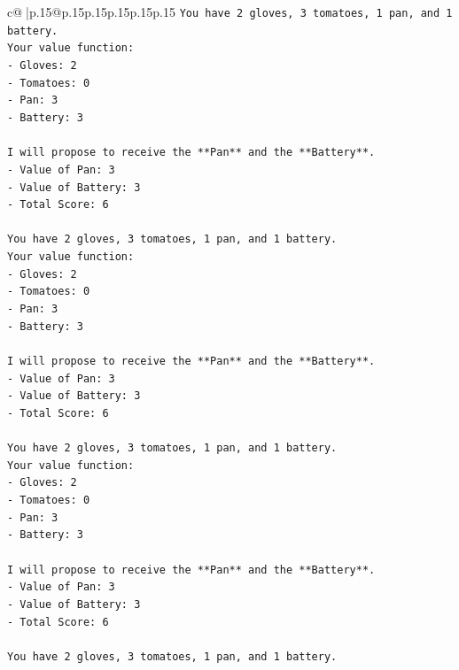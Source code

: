 \documentclass{article}
\begin{document}
{\begin{supertabular}{c@{$\;$}|p{.15\linewidth}@{}p{.15\linewidth}p{.15\linewidth}p{.15\linewidth}p{.15\linewidth}p{.15\linewidth}}
{{{\texttt{You have 2 gloves, 3 tomatoes, 1 pan, and 1 battery.} \\
\texttt{Your value function:} \\
\texttt{{-} Gloves: 2} \\
\texttt{{-} Tomatoes: 0} \\
\texttt{{-} Pan: 3} \\
\texttt{{-} Battery: 3} \\
\\ 
\texttt{I will propose to receive the **Pan** and the **Battery**.} \\
\texttt{{-} Value of Pan: 3} \\
\texttt{{-} Value of Battery: 3} \\
\texttt{{-} Total Score: 6} \\
\\ 
\texttt{You have 2 gloves, 3 tomatoes, 1 pan, and 1 battery.} \\
\texttt{Your value function:} \\
\texttt{{-} Gloves: 2} \\
\texttt{{-} Tomatoes: 0} \\
\texttt{{-} Pan: 3} \\
\texttt{{-} Battery: 3} \\
\\ 
\texttt{I will propose to receive the **Pan** and the **Battery**.} \\
\texttt{{-} Value of Pan: 3} \\
\texttt{{-} Value of Battery: 3} \\
\texttt{{-} Total Score: 6} \\
\\ 
\texttt{You have 2 gloves, 3 tomatoes, 1 pan, and 1 battery.} \\
\texttt{Your value function:} \\
\texttt{{-} Gloves: 2} \\
\texttt{{-} Tomatoes: 0} \\
\texttt{{-} Pan: 3} \\
\texttt{{-} Battery: 3} \\
\\ 
\texttt{I will propose to receive the **Pan** and the **Battery**.} \\
\texttt{{-} Value of Pan: 3} \\
\texttt{{-} Value of Battery: 3} \\
\texttt{{-} Total Score: 6} \\
\\ 
\texttt{You have 2 gloves, 3 tomatoes, 1 pan, and 1 battery.} \\
}}}
\end{supertabular}}
\end{document}

